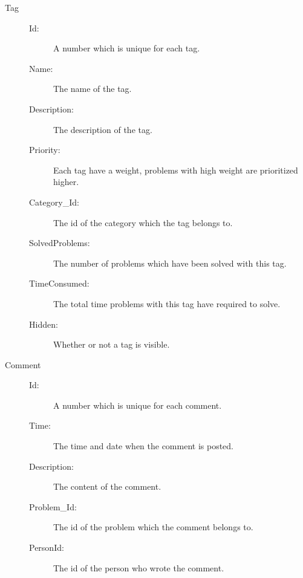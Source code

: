 \begin{description}
\item[Tag]\hfill
\begin{description}
\item[Id:] A number which is unique for each tag. 
\item[Name:] The name of the tag.
\item[Description:] The description of the tag.
\item[Priority:] Each tag have a weight, problems with high weight are prioritized higher.
\item[Category\_Id:] The id of the category which the tag belongs to. 
\item[SolvedProblems:] The number of problems which have been solved with this tag.
\item[TimeConsumed:] The total time problems with this tag have required to solve.
\item[Hidden:] Whether or not a tag is visible.
\end{description}
\end{description}

\begin{description}
\item[Comment]\hfill
\begin{description}
\item[Id:] A number which is unique for each comment. 
\item[Time:] The time and date when the comment is posted.  
\item[Description:] The content of the comment.
\item[Problem\_Id:] The id of the problem which the comment belongs to.
\item[PersonId:] The id of the person who wrote the comment.
\end{description}
\end{description}
